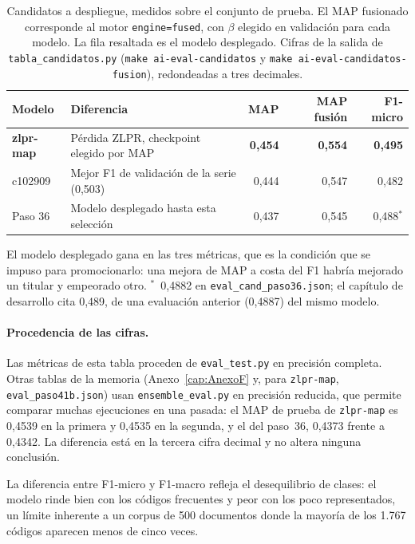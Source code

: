 \begin{table}[H]
\centering
\small
\caption[Candidatos a despliegue, medidos sobre el conjunto de prueba]{Candidatos a despliegue, medidos sobre el conjunto de prueba. El MAP fusionado corresponde al motor \texttt{engine=fused}, con $\beta$ elegido en validación para cada modelo. La fila resaltada es el modelo desplegado. Cifras de la salida de \texttt{tabla\_candidatos.py} (\texttt{make ai-eval-candidatos} y \texttt{make ai-eval-candidatos-fusion}), redondeadas a tres decimales.}
\label{tab:candidatos}
\begin{tabular}{lP{6.2cm}rrr}
\hline
\textbf{Modelo} & \textbf{Diferencia} & \textbf{MAP} & \textbf{MAP fusión} & \textbf{F1-micro} \\
\hline
{}
\textbf{zlpr-map} & Pérdida ZLPR, checkpoint elegido por MAP & \textbf{0{,}454} & \textbf{0{,}554} & \textbf{0{,}495} \\
c102909 & Mejor F1 de validación de la serie (0,503) & 0{,}444 & 0{,}547 & 0{,}482 \\
Paso 36 & Modelo desplegado hasta esta selección & 0{,}437 & 0{,}545 & 0{,}488$^{*}$ \\
\hline
\end{tabular}

\vspace{2mm}
{\footnotesize El modelo desplegado gana en las tres métricas, que es la condición que se impuso para promocionarlo: una mejora de MAP a costa del F1 habría mejorado un titular y empeorado otro. $^{*}$~0,4882 en \texttt{eval\_cand\_paso36.json}; el capítulo de desarrollo cita 0,489, de una evaluación anterior (0,4887) del mismo modelo.}
\end{table}

\paragraph{Procedencia de las cifras.} Las métricas de esta tabla proceden de \texttt{eval\_test.py} en precisión completa. Otras tablas de la memoria (Anexo~\ref{cap:AnexoF} y, para \texttt{zlpr-map}, \texttt{eval\_paso41b.json}) usan \texttt{ensemble\_eval.py} en precisión reducida, que permite comparar muchas ejecuciones en una pasada: el MAP de prueba de \texttt{zlpr-map} es 0,4539 en la primera y 0,4535 en la segunda, y el del paso~36, 0,4373 frente a 0,4342. La diferencia está en la tercera cifra decimal y no altera ninguna conclusión.

La diferencia entre F1-micro y F1-macro refleja el desequilibrio de clases: el modelo rinde bien con los códigos frecuentes y peor con los poco representados, un límite inherente a un corpus de 500 documentos donde la mayoría de los 1.767 códigos aparecen menos de cinco veces.


